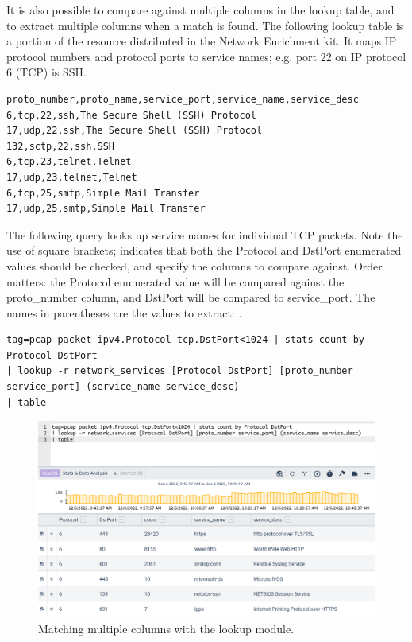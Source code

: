 It is also possible to compare against multiple columns in the lookup table, and to extract multiple columns when a match is found. The following lookup table is a portion of the  resource distributed in the Network Enrichment kit. It maps IP protocol numbers and protocol ports to service names; e.g. port 22 on IP protocol 6 (TCP) is SSH.

\begin{verbatim}
proto_number,proto_name,service_port,service_name,service_desc
6,tcp,22,ssh,The Secure Shell (SSH) Protocol
17,udp,22,ssh,The Secure Shell (SSH) Protocol
132,sctp,22,ssh,SSH
6,tcp,23,telnet,Telnet
17,udp,23,telnet,Telnet
6,tcp,25,smtp,Simple Mail Transfer
17,udp,25,smtp,Simple Mail Transfer
\end{verbatim}

The following query looks up service names for individual TCP packets. Note the use of square brackets;  indicates that both the Protocol and DstPort enumerated values should be checked, and  specify the columns to compare against. Order matters: the Protocol enumerated value will be compared against the proto\_number column, and DstPort will be compared to service\_port. The names in parentheses are the values to extract: .

\begin{verbatim}
tag=pcap packet ipv4.Protocol tcp.DstPort<1024 | stats count by Protocol DstPort 
| lookup -r network_services [Protocol DstPort] [proto_number service_port] (service_name service_desc)
| table
\end{verbatim}

\begin{figure}
	\includegraphics[width=0.8\linewidth]{images/lookup2.png}
	\caption{Matching multiple columns with the lookup module.}
	\label{fig:lookup2}
\end{figure}

